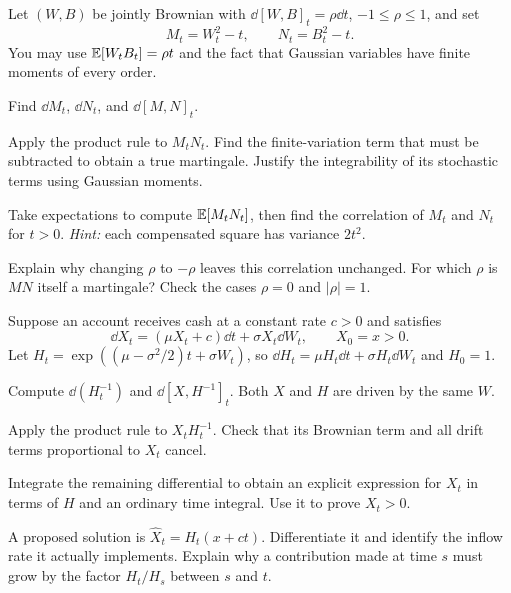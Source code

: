 \begin{exercise}
Let \((W,B)\) be jointly Brownian with
\(\dd[W,B]_t=\rho\dd t\), \(-1\leq\rho\leq1\), and set
\[
M_t=W_t^2-t,
\qquad
N_t=B_t^2-t.
\]
You may use \(\mathbb E[W_tB_t]=\rho t\) and the fact that Gaussian variables
have finite moments of every order.
\begin{exparts}
  \item Find \(\dd M_t\), \(\dd N_t\), and \(\dd[M,N]_t\).
  \item Apply the product rule to \(M_tN_t\). Find the finite-variation
  term that must be subtracted to obtain a true martingale. Justify the
  integrability of its stochastic terms using Gaussian moments.
  \item Take expectations to compute \(\mathbb E[M_tN_t]\), then find the
  correlation of \(M_t\) and \(N_t\) for \(t>0\).
  \emph{Hint:} each compensated square has variance \(2t^2\).
  \item Explain why changing \(\rho\) to \(-\rho\) leaves this
  correlation unchanged. For which \(\rho\) is \(MN\) itself a
  martingale? Check the cases \(\rho=0\) and \(|\rho|=1\).
\end{exparts}
\end{exercise}

\begin{exercise}
Suppose an account receives cash at a constant rate \(c>0\) and satisfies
\[
\dd X_t=(\mu X_t+c)\dd t+\sigma X_t\dd W_t,
\qquad X_0=x>0.
\]
Let \(H_t=\exp((\mu-\sigma^2/2)t+\sigma W_t)\), so
\(\dd H_t=\mu H_t\dd t+\sigma H_t\dd W_t\) and \(H_0=1\).
\begin{exparts}
  \item Compute \(\dd(H_t^{-1})\) and \(\dd[X,H^{-1}]_t\).
  Both \(X\) and \(H\) are driven by the same \(W\).
  \item Apply the product rule to \(X_tH_t^{-1}\). Check that its
  Brownian term and all drift terms proportional to \(X_t\) cancel.
  \item Integrate the remaining differential to obtain an explicit
  expression for \(X_t\) in terms of \(H\) and an ordinary time integral.
  Use it to prove \(X_t>0\).
  \item A proposed solution is \(\widehat X_t=H_t(x+ct)\).
  Differentiate it and identify the inflow rate it actually implements.
  Explain why a contribution made at time \(s\) must grow by the factor
  \(H_t/H_s\) between \(s\) and \(t\).
\end{exparts}
\end{exercise}

